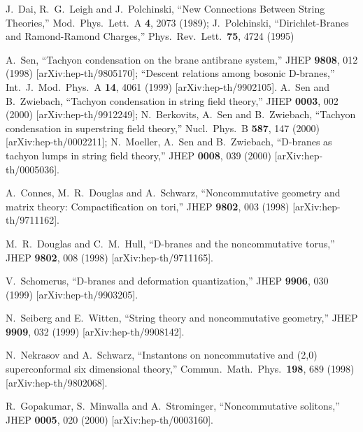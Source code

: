 \documentclass[a4paper,12pt]{article}
\begin{document}
\begin{thebibliography}{999}
\parskip=-3pt


J.~Dai, R.~G.~Leigh and J.~Polchinski,
``New Connections Between String Theories,''
Mod.\ Phys.\ Lett.\ A {\bf 4}, 2073 (1989);
J.~Polchinski,
``Dirichlet-Branes and Ramond-Ramond Charges,''
Phys.\ Rev.\ Lett.\  {\bf 75}, 4724 (1995)

A.~Sen,
``Tachyon condensation on the brane antibrane system,''
JHEP {\bf 9808}, 012 (1998)
[arXiv:hep-th/9805170];
``Descent relations among bosonic D-branes,''
Int.\ J.\ Mod.\ Phys.\ A {\bf 14}, 4061 (1999)
[arXiv:hep-th/9902105].
A.~Sen and B.~Zwiebach,
``Tachyon condensation in string field theory,''
JHEP {\bf 0003}, 002 (2000)
[arXiv:hep-th/9912249];
N.~Berkovits, A.~Sen and B.~Zwiebach,
``Tachyon condensation in superstring field theory,''
Nucl.\ Phys.\ B {\bf 587}, 147 (2000)
[arXiv:hep-th/0002211];
N.~Moeller, A.~Sen and B.~Zwiebach,
``D-branes as tachyon lumps in string field theory,''
JHEP {\bf 0008}, 039 (2000)
[arXiv:hep-th/0005036].



A.~Connes, M.~R.~Douglas and A.~Schwarz,
``Noncommutative geometry and matrix theory: Compactification on tori,''
JHEP {\bf 9802}, 003 (1998)
[arXiv:hep-th/9711162].

M.~R.~Douglas and C.~M.~Hull,
``D-branes and the noncommutative torus,''
JHEP {\bf 9802}, 008 (1998)
[arXiv:hep-th/9711165].


V.~Schomerus,
``D-branes and deformation quantization,''
JHEP {\bf 9906}, 030 (1999)
[arXiv:hep-th/9903205].


N.~Seiberg and E.~Witten,
``String theory and noncommutative geometry,''
JHEP {\bf 9909}, 032 (1999)
[arXiv:hep-th/9908142].





N.~Nekrasov and A.~Schwarz,
``Instantons on noncommutative \coordHE{} 
and (2,0) superconformal six  dimensional theory,''
Commun.\ Math.\ Phys.\  {\bf 198}, 689 (1998)
[arXiv:hep-th/9802068].


R.~Gopakumar, S.~Minwalla and A.~Strominger,
``Noncommutative solitons,''
JHEP {\bf 0005}, 020 (2000)
[arXiv:hep-th/0003160].







\end{thebibliography}
\end{document}
